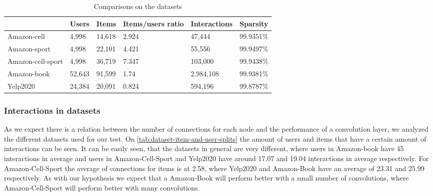 \begin{table*}[]
    \centering
    \begin{tabular}{|l|l|l|l|l|l|}
        \hline
                          & Users  & Items  & Items/users ratio & Interactions & Sparsity  \\ \hline
        Amazon-cell       & 4,998  & 14,618 & 2.924             & 47,444       & 99.9351\% \\ \hline
        Amazon-sport      & 4,998  & 22,101 & 4.421             & 55,556       & 99.9497\% \\ \hline
        Amazon-cell-sport & 4,998  & 36,719 & 7.347             & 103,000      & 99.9438\% \\ \hline
        Amazon-book       & 52,643 & 91,599 & 1.74              & 2,984,108    & 99.9381\% \\ \hline
        Yelp2020          & 24,384 & 20,091 & 0.824             & 594,196      & 99.8787\% \\ \hline
    \end{tabular}
    \caption{Comparisons on the datasets}
    \label{tab:dataset-comparison}
\end{table*}

\subsubsection{Interactions in datasets}
As we expect there is a relation between the number of connections for each node and the performance of a convolution layer, we analyzed the different datasets used for our test.
On \autoref{tab:dataset-item-and-user-splits} the amount of users and items that have a certain amount of interactions can be seen.
It can be easily seen, that the datasets in general are very different, where users in Amazon-book have 45 interactions in average and users in Amazon-Cell-Sport and Yelp2020 have around 17.07 and 19.04 interactions in average respectively.
For Amazon-Cell-Sport the average of connections for items is at 2.58, where Yelp2020 and Amazon-Book have an average of 23.31 and 25.99 respectively.
As with our hypothesis we expect that a Amazon-Book will perform better with a small number of convolutions, where Amazon-Cell-Sport will perform better with many convolutions.

